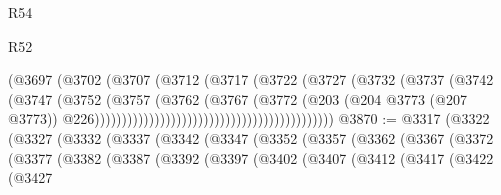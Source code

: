 \begin{lexlean}{R54}
\begin{lexlean}{R52}
\begin{coremodule}
{{{{{{{{{{{{{{{{{{{{{{{{{{{{{{{{{{{{{{{{{{{{{{{{{{{{{{{{{{{{{{{{{{{{{{{{{{{{{{{{{{{{{{{{{{{{{{{{{{{{{{{{{{{{{{{{{{{{{{{{{{{{{{{{{{{{{{{{{{{{{{{{{{{{{{{{{{{{{{{{{{{{{{{{{{{{{{{{{{{{{{{{{{{{{{{{{{{{{{                                                          (@3697
                                                            (@3702
                                                              (@3707
                                                                (@3712
                                                                  (@3717
                                                                    (@3722
                                                                      (@3727
                                                                        (@3732
                                                                          (@3737
                                                                            (@3742
                                                                              (@3747
                                                                                (@3752
                                                                                  (@3757
                                                                                    (@3762
                                                                                      (@3767
                                                                                        (@3772
                                                                                          (@203
                                                                                            (@204
                                                                                              @3773
                                                                                              (@207
                                                                                                @3773))
                                                                                            @226))))))))))))))))))))))))))))))))))))))))))))
@3870 := @3317
    (@3322
      (@3327
        (@3332
          (@3337
            (@3342
              (@3347
                (@3352
                  (@3357
                    (@3362
                      (@3367
                        (@3372
                          (@3377
                            (@3382
                              (@3387
                                (@3392
                                  (@3397
                                    (@3402
                                      (@3407
                                        (@3412
                                          (@3417
                                            (@3422
                                              (@3427
}}}}}}}}}}}}}}}}}}}}}}}}}}}}}}}}}}}}}}}}}}}}}}}}}}}}}}}}}}}}}}}}}}}}}}}}}}}}}}}}}}}}}}}}}}}}}}}}}}}}}}}}}}}}}}}}}}}}}}}}}}}}}}}}}}}}}}}}}}}}}}}}}}}}}}}}}}}}}}}}}}}}}}}}}}}}}}}}}}}}}}}}}}}}}}}}}}}}}}
\end{coremodule}
\end{lexlean}
\end{lexlean}
